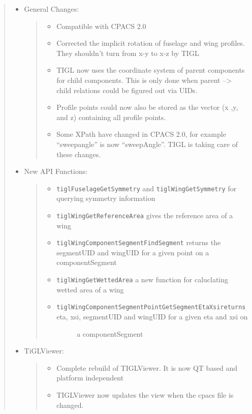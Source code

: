 \documentclass[]{scrartcl}
\begin{document}
\begin{quote}
\begin{itemize}
\item
  General Changes:

  \begin{quote}
  \begin{itemize}
  \itemsep1pt\parskip0pt
  \item
    Compatible with CPACS 2.0
  \item
    Corrected the implicit rotation of fuselage and wing profiles. They
    shouldn't turn from x-y to x-z by TIGL
  \item
    TIGL now uses the coordinate system of parent components for child
    components. This is only done when parent --\textgreater{} child
    relations could be figured out via UIDs.
  \item
    Profile points could now also be stored as the vector (x ,y, and z)
    containing all profile points.
  \item
    Some XPath have changed in CPACS 2.0, for example ``sweepangle'' is
    now ``sweepAngle''. TIGL is taking care of these changes.
  \end{itemize}
  \end{quote}
\item
  New API Functions:

  \begin{quote}
  \begin{itemize}
  \item
    \texttt{tiglFuselageGetSymmetry} and \texttt{tiglWingGetSymmetry}
    for querying symmetry information
  \item
    \texttt{tiglWingGetReferenceArea} gives the reference area of a wing
  \item
    \texttt{tiglWingComponentSegmentFindSegment} returns the segmentUID
    and wingUID for a given point on a componentSegment
  \item
    \texttt{tiglWingGetWettedArea} a new function for caluclating wetted
    area of a wing
  \item
    \begin{description}
    \item[\texttt{tiglWingComponentSegmentPointGetSegmentEtaXsireturns}
    eta, xsi, segmentUID and wingUID for a given eta and xsi on]
    a componentSegment
    \end{description}
  \end{itemize}
  \end{quote}
\item
  TiGLViewer:

  \begin{quote}
  \begin{itemize}
  \itemsep1pt\parskip0pt
  \item
    Complete rebuild of TIGLViewer. It is now QT based and platform
    independent
  \item
    TIGLViewer now updates the view when the cpacs file is changed.
  \end{itemize}
  \end{quote}
\end{itemize}
\end{quote}
\end{document}
